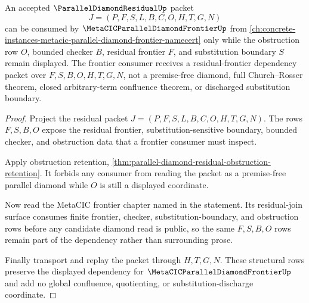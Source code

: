 \begin{theorem}
\label{thm:parallel-diamond-residual-frontier-obstruction-route}
An accepted $\ParallelDiamondResidualUp$ packet
$$
J=(P,F,S,L,B,C,O,H,T,G,N)
$$
can be consumed by $\MetaCICParallelDiamondFrontierUp$ from \autoref{ch:concrete-instances-metacic-parallel-diamond-frontier-namecert} only while the obstruction row $O$, bounded checker $B$, residual frontier $F$, and substitution boundary $S$ remain displayed. The frontier consumer receives a residual-frontier dependency packet over $F,S,B,O,H,T,G,N$, not a premise-free diamond, full Church--Rosser theorem, closed arbitrary-term confluence theorem, or discharged substitution boundary.
\end{theorem}
\begin{proof}
Project the residual packet $J=(P,F,S,L,B,C,O,H,T,G,N)$. The rows $F,S,B,O$ expose the residual frontier, substitution-sensitive boundary, bounded checker, and obstruction data that a frontier consumer must inspect.

Apply obstruction retention, \autoref{thm:parallel-diamond-residual-obstruction-retention}. It forbids any consumer from reading the packet as a premise-free parallel diamond while $O$ is still a displayed coordinate.

Now read the MetaCIC frontier chapter named in the statement. Its residual-join surface consumes finite frontier, checker, substitution-boundary, and obstruction rows before any candidate diamond read is public, so the same $F,S,B,O$ rows remain part of the dependency rather than surrounding prose.

Finally transport and replay the packet through $H,T,G,N$. These structural rows preserve the displayed dependency for $\MetaCICParallelDiamondFrontierUp$ and add no global confluence, quotienting, or substitution-discharge coordinate.
\end{proof}

